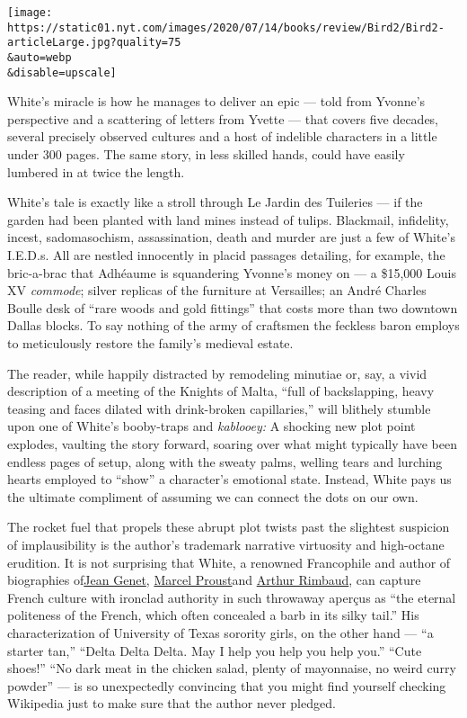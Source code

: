 \texttt{[image: https://static01.nyt.com/images/2020/07/14/books/review/Bird2/Bird2-articleLarge.jpg?quality=75\\\&auto=webp\\\&disable=upscale]}

White's miracle is how he manages to deliver an epic --- told from
Yvonne's perspective and a scattering of letters from Yvette --- that
covers five decades, several precisely observed cultures and a host of
indelible characters in a little under 300 pages. The same story, in
less skilled hands, could have easily lumbered in at twice the length.

White's tale is exactly like a stroll through Le Jardin des Tuileries
--- if the garden had been planted with land mines instead of tulips.
Blackmail, infidelity, incest, sadomasochism, assassination, death and
murder are just a few of White's I.E.D.s. All are nestled innocently in
placid passages detailing, for example, the bric-a-brac that Adhéaume is
squandering Yvonne's money on --- a \$15,000 Louis XV \emph{commode};
silver replicas of the furniture at Versailles; an André Charles Boulle
desk of ``rare woods and gold fittings'' that costs more than two
downtown Dallas blocks. To say nothing of the army of craftsmen the
feckless baron employs to meticulously restore the family's medieval
estate.

The reader, while happily distracted by remodeling minutiae or, say, a
vivid description of a meeting of the Knights of Malta, ``full of
backslapping, heavy teasing and faces dilated with drink-broken
capillaries,'' will blithely stumble upon one of White's booby-traps and
\emph{kablooey:} A shocking new plot point explodes, vaulting the story
forward, soaring over what might typically have been endless pages of
setup, along with the sweaty palms, welling tears and lurching hearts
employed to ``show'' a character's emotional state. Instead, White pays
us the ultimate compliment of assuming we can connect the dots on our
own.

The rocket fuel that propels these abrupt plot twists past the slightest
suspicion of implausibility is the author's trademark narrative
virtuosity and high-octane erudition. It is not surprising that White, a
renowned Francophile and author of biographies
of\href{https://www.nytimes.com/1993/11/07/books/the-high-priest-of-apostasy.html}{Jean
Genet},
\href{https://www.nytimes.com/1999/01/10/books/biography-the-short-form.html}{Marcel
Proust}and
\href{https://www.nytimes.com/2008/10/12/books/review/Hell-t.html}{Arthur
Rimbaud}, can capture French culture with ironclad authority in such
throwaway aperçus as ``the eternal politeness of the French, which often
concealed a barb in its silky tail.'' His characterization of University
of Texas sorority girls, on the other hand --- ``a starter tan,''
``Delta Delta Delta. May I help you help you help you.'' ``Cute shoes!''
``No dark meat in the chicken salad, plenty of mayonnaise, no weird
curry powder'' --- is so unexpectedly convincing that you might find
yourself checking Wikipedia just to make sure that the author never
pledged.

